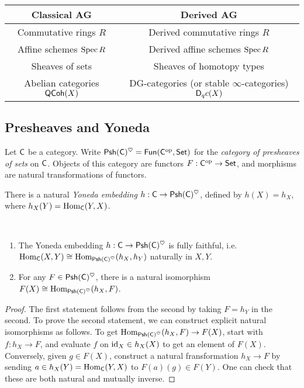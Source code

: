 \documentclass{amsart}
\begin{document}
\begin{center}
	\begin{tabular}{c|c}
		Classical AG & Derived AG \\ \hline
		Commutative rings $R$ & Derived commutative rings $R$ \\
		Affine schemes $\operatorname{Spec} R$ & Derived affine schemes $\operatorname{Spec} R$ \\
		Sheaves of sets & Sheaves of homotopy types \\
		Abelian categories $\mathsf{QCoh}(X)$ & DG-categories (or stable $\infty$-categories) $\mathsf{D}_qc(X)$
	\end{tabular}
\end{center}

\subsection{Presheaves and Yoneda}

Let $\mathsf{C}$ be a category.
Write $\mathsf{Psh}(\mathsf{C})^\heartsuit = \mathsf{Fun}(\mathsf{C}^{\mathrm{op}}, \mathsf{Set})$ for the \emph{category of presheaves of sets} on $\mathsf{C}$.
Objects of this category are functors $F: \mathsf{C}^{\mathrm{op}} \to \mathsf{Set}$, and morphisms are natural transformations of functors.

There is a natural \emph{Yoneda embedding} $h: \mathsf{C} \to \mathsf{Psh}(\mathsf{C})^\heartsuit$, defined by $h(X) = h_X$, where $h_X(Y) = \operatorname{Hom}_{\mathsf{C}}(Y, X)$.

\begin{lem}[Yoneda]
\,
\begin{enumerate}
	\item The Yoneda embedding $h: \mathsf{C} \to \mathsf{Psh}(\mathsf{C})^\heartsuit$ is fully faithful, i.e.\ $\operatorname{Hom}_{\mathsf{C}}(X, Y) \cong \operatorname{Hom}_{\mathsf{Psh}(\mathsf{C})^\heartsuit}(h_X, h_Y)$ naturally in $X, Y$.
	\item For any $F \in \mathsf{Psh}(\mathsf{C})^\heartsuit$, there is a natural isomorphism $F(X) \cong \operatorname{Hom}_{\mathsf{Psh}(\mathsf{C})^\heartsuit}(h_X, F)$.
\end{enumerate}
\end{lem}

\begin{proof}
The first statement follows from the second by taking $F = h_Y$ in the second.
To prove the second statement, we can construct explicit natural isomorphisms as follows.
To get $\operatorname{Hom}_{\mathsf{Psh}(\mathsf{C})^\heartsuit}(h_X, F) \to F(X)$, start with $f: h_X \to F$, and evaluate $f$ on $\operatorname{id}_X \in h_X(X)$ to get an element of $F(X)$.
Conversely, given $g \in F(X)$, construct a natural fransformation $h_X \to F$ by sending $a \in h_X(Y) = \operatorname{Hom}_{\mathsf{C}}(Y, X)$ to $F(a)(g) \in F(Y)$.
One can check that these are both natural and mutually inverse. 
\end{proof}
\end{document}
